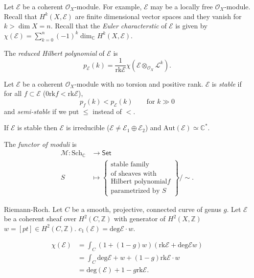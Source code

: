 Let $\mathcal{E}$ be a coherent
$\mathcal{O}_X$-module.
For example, $\mathcal{E}$ may be a locally
free $\mathcal{O}_X$-module.
Recall that $H^k(X,\mathcal{E})$ are finite
dimensional vector spaces
and they vanish for $k>\dim X=n$.
Recall that the {\it Euler characterstic} of
$\mathcal{E}$
is given by
$\chi(\mathcal{E})=\sum_{k=0}^n(-1)
^k\dim_{\mathbb{C}}H^k(X,\mathcal{E})$.

The {\it reduced Hilbert polynomial} of
$\mathcal{E}$ is
$$
p_{\mathcal{E}}(k)=\frac{1}{\text{rk}
\mathcal{E}}
\chi(\mathcal{E}\otimes_{\mathcal{O}_X}
\mathcal{L}^k).
$$

\begin{definition}
\label{definition-stable-module}
Let $\mathcal{E}$ be a coherent
$\mathcal{O}_X$-module
with no torsion and positive rank.
$\mathcal{E}$ is {\it stable} if for all $f
\subset \mathcal{E}$
($0 \text{rk} f<\text{rk}\mathcal{E}$),
$$
p_f(k)<p_{\mathcal{E}}(k)\qquad \text{for }
k\gg 0
$$
and {\it semi-stable} if we put $\leq$
instead of $<$.

\begin{lemma}
\label{lemma-stable}
If $\mathcal{E}$ is stable then $\mathcal{E}$
is irreducible
($\mathcal{E} \neq  \mathcal{E}_1 \oplus
\mathcal{E}_2$)
and $\text{Aut}(\mathcal{E})\simeq
\mathbb{C}^*$.
\end{lemma}

\end{definition}

The {\it functor of moduli} is
$$
\begin{aligned}
\mathcal{M}: \text{Sch}_\mathbb{C}
&\longrightarrow \mathsf{Set} \\
S
&\longmapsto
\left\{
\substack{\text{stable family}  \\ \text{of
sheaves with} \\
\text{Hilbert polynomial} f\\
\text{parametrized by $S$}}
\right\}\Big/\sim.
\end{aligned}
$$

\medskip\noindent
Riemann-Roch.
Let $C$ be a smooth, projective, connected
curve
of genus $g$.
Let $\mathcal{E}$ be a coherent sheaf over
$H^2(C,\mathbb{Z})$
with generator of $H^2(X,\mathbb{Z})$
$w=[pt] \in H^2(C,\mathbb{Z})$.
$c_1(\mathcal{E})=\text{deg}\mathcal{E}\cdot
w$.

\begin{theorem}
\label{theorem-euler-characteristic-moduli}
$$
\begin{aligned}
\chi(\mathcal{E})
&=\int_C(1+(1-g)w)(\text{rk}\mathcal{E}+
\text{deg}\mathcal{E}w)\\
&=\int_C
\text{deg}\mathcal{E}+w+(1-g)\text{rk}
\mathcal{E}\cdot
w\\
&=\text{deg}(\mathcal{E})+1-g
\text{rk}\mathcal{E}.
\end{aligned}
$$
\end{theorem}

